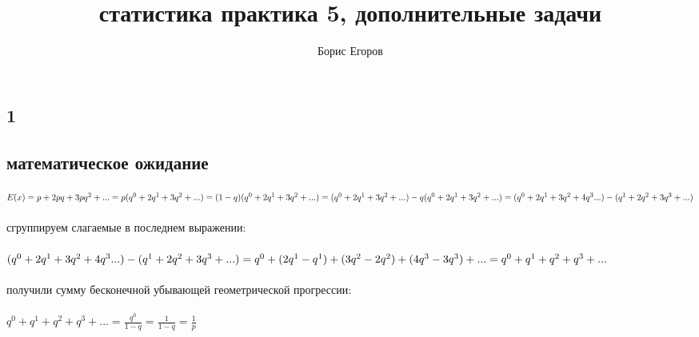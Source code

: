 \documentclass[a4paper]{article}
\author{Борис Егоров}
\title{статистика практика 5, дополнительные задачи}
\begin{document}
	\maketitle
	\begin{large}
	\section*{1}
	\subsection*{математическое ожидание}
	$
	E(x)=\\\\
	p+2pq+3pq^2+...=\\\\
	p(q^0+2q^1+3q^2+...)=\\\\
	(1-q)(q^0+2q^1+3q^2+...)=\\\\
	(q^0+2q^1+3q^2+...)-q(q^0+2q^1+3q^2+...)=\\\\
	(q^0+2q^1+3q^2+4q^3...)-(q^1+2q^2+3q^3+...)
	$\\\\
	сгруппируем слагаемые в последнем выражении:\\\\
	$
	(q^0+2q^1+3q^2+4q^3...)-(q^1+2q^2+3q^3+...)=\\\\
	q^0+(2q^1-q^1)+(3q^2-2q^2)+(4q^3-3q^3)+...=\\\\
	q^0+q^1+q^2+q^3+...
	$\\\\
	получили сумму бесконечной убывающей геометрической прогрессии:\\\\
	$q^0+q^1+q^2+q^3+...=\frac{q^0}{1-q}=\frac{1}{1-q}=\frac{1}{p}$

\end{large}
\end{document}
